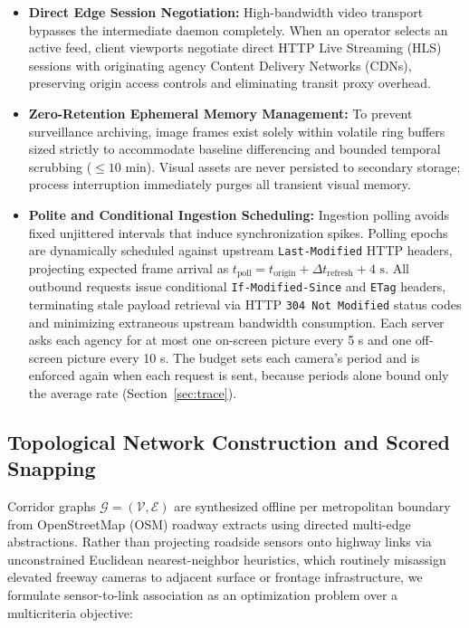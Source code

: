 \documentclass[10pt,journal,compsoc]{IEEEtran}
\begin{document}
\begin{itemize}
    \item \textbf{Direct Edge Session Negotiation:} High-bandwidth video transport bypasses the intermediate daemon completely. When an operator selects an active feed, client viewports negotiate direct HTTP Live Streaming (HLS) sessions with originating agency Content Delivery Networks (CDNs), preserving origin access controls and eliminating transit proxy overhead.
    
    \item \textbf{Zero-Retention Ephemeral Memory Management:} To prevent surveillance archiving, image frames exist solely within volatile ring buffers sized strictly to accommodate baseline differencing and bounded temporal scrubbing ($\le 10\text{ min}$). Visual assets are never persisted to secondary storage; process interruption immediately purges all transient visual memory.
    
    \item \textbf{Polite and Conditional Ingestion Scheduling:} Ingestion polling avoids fixed unjittered intervals that induce synchronization spikes. Polling epochs are dynamically scheduled against upstream \texttt{Last-Modified} HTTP headers, projecting expected frame arrival as $t_{\text{poll}} = t_{\text{origin}} + \Delta t_{\text{refresh}} + 4\text{ s}$. All outbound requests issue conditional \texttt{If-Modified-Since} and \texttt{ETag} headers, terminating stale payload retrieval via HTTP \texttt{304 Not Modified} status codes and minimizing extraneous upstream bandwidth consumption. Each server asks each agency for at most one on-screen picture every 5 s and one off-screen picture every 10 s. The budget sets each camera's period and is enforced again when each request is sent, because periods alone bound only the average rate (Section~\ref{sec:trace}).
\end{itemize}

\subsection{Topological Network Construction and Scored Snapping}
Corridor graphs $\mathcal{G} = (\mathcal{V}, \mathcal{E})$ are synthesized offline per metropolitan boundary from OpenStreetMap (OSM) roadway extracts using directed multi-edge abstractions. Rather than projecting roadside sensors onto highway links via unconstrained Euclidean nearest-neighbor heuristics, which routinely misassign elevated freeway cameras to adjacent surface or frontage infrastructure, we formulate sensor-to-link association as an optimization problem over a multicriteria objective:
\end{document}
